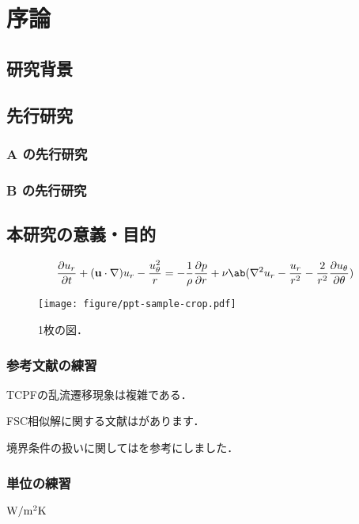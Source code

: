 
\chapter{序論}
\label{ch:introduction}


\section{研究背景}
\label{sec:background}


\section{先行研究}
\label{sec:previous}

\subsection{A の先行研究}
\label{ssec:previous_A}

\subsection{B の先行研究}
\label{ssec:previous_B}


\section{本研究の意義・目的}
\label{sec:objective}

\begin{equation}
    \pdv{u_r}{t} + (\mathbf{u}\cdot\nabla)u_r - \frac{u_\theta^2}{r} = 
    -\frac{1}{\rho}\pdv{p}{r} + \nu\ab(\nabla^2 u_r - \frac{u_r}{r^2} - \frac{2}{r^2}\pdv{u_\theta}{\theta})
    \label{eq:NSr2}
\end{equation}

\begin{figure}[tp]
    \centering
    \texttt{[image: figure/ppt-sample-crop.pdf]}
    \caption{1枚の図．}
    \label{fig:one_figure}
\end{figure}

\subsection{参考文献の練習}
\label{ssec:bibtex}

\citet{Matsukawa:PoF2022}

TCPFの乱流遷移現象は複雑である\citep{Matsukawa:PoF2022}．

FSC相似解に関する文献は\citet{Liu:2021}があります．

境界条件の扱いに関しては\citet{Guastoni:2021}を参考にしました．

\subsection{単位の練習}
\label{ssec:unit}

$\si[per-mode=symbol]{\watt\per{\square\meter\kelvin}}$